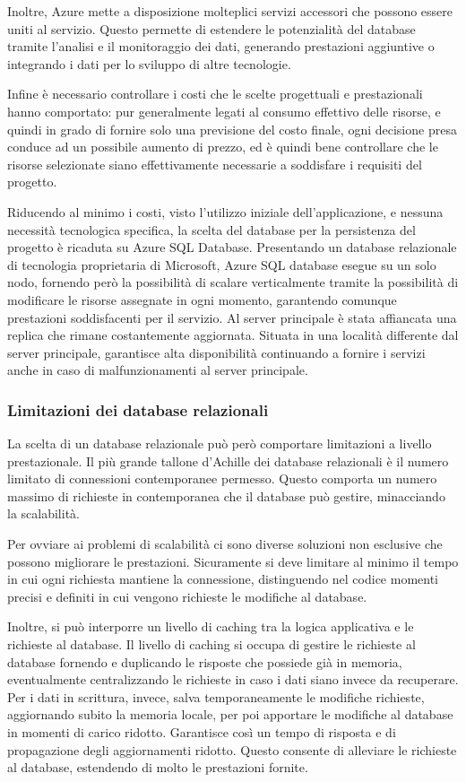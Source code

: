 Inoltre, Azure mette a disposizione molteplici servizi accessori che possono essere uniti al servizio. Questo permette di estendere le potenzialità del database tramite  l’analisi e il monitoraggio dei dati, generando prestazioni aggiuntive o integrando i dati per lo sviluppo di altre tecnologie.

Infine è necessario controllare i costi che le scelte progettuali e prestazionali hanno comportato: pur generalmente legati al consumo effettivo delle risorse, e quindi in grado di fornire solo una previsione del costo finale, ogni decisione presa conduce ad un possibile aumento di prezzo, ed è quindi bene controllare che le risorse selezionate siano effettivamente  necessarie a soddisfare i requisiti del progetto.

Riducendo al minimo i costi, visto l’utilizzo iniziale dell’applicazione, e nessuna necessità tecnologica specifica, la scelta del database per la persistenza del progetto è ricaduta su Azure SQL Database. 
Presentando un database relazionale di tecnologia proprietaria di Microsoft, Azure SQL database esegue su un solo nodo, fornendo però la possibilità di  scalare  verticalmente tramite la possibilità di modificare le risorse assegnate in ogni momento, garantendo comunque prestazioni soddisfacenti per il servizio.
Al server principale è stata affiancata una replica che rimane costantemente aggiornata. Situata in una località differente dal server principale, garantisce alta disponibilità continuando a fornire i servizi anche in caso di malfunzionamenti al server principale.
\subsubsection{ Limitazioni dei database relazionali}

La scelta di un database relazionale può però comportare limitazioni a livello prestazionale. Il più grande tallone d'Achille dei database relazionali è il numero limitato di connessioni contemporanee permesso. Questo comporta un numero massimo di richieste in contemporanea che il database può gestire, minacciando la scalabilità. 

Per ovviare ai problemi di scalabilità ci sono diverse soluzioni non esclusive che possono migliorare le prestazioni. Sicuramente si deve limitare al minimo il tempo in cui ogni richiesta mantiene la connessione, distinguendo nel codice momenti precisi e definiti in cui vengono richieste le modifiche al database.   

Inoltre, si può interporre un livello di caching tra la logica applicativa e le richieste al database. Il livello di caching si occupa di gestire le richieste al database fornendo e duplicando le risposte che possiede già in memoria, eventualmente centralizzando le richieste in caso i dati siano invece da recuperare. Per i dati in scrittura, invece, salva temporaneamente le modifiche richieste, aggiornando subito la memoria locale, per poi apportare le modifiche al database in momenti di carico ridotto. Garantisce così un tempo di risposta e di propagazione degli aggiornamenti ridotto. Questo consente di alleviare le richieste al database, estendendo di molto le prestazioni fornite.

